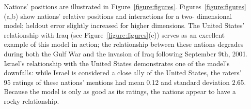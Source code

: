 Nations' positions are illustrated in Figure~\ref{figure:figures}.
Figures~\ref{figure:figures}(a,b) show nations' relative positions
and interactions for a two- dimensional model; heldout error slightly
increased for higher dimensions. The United States' relationship with
Iraq (see Figure~\ref{figure:figures}(c)) serves as an excellent
example of this model in action; the relationship between these
nations degrades during both the Gulf War and the invasion of Iraq
following September 9th, 2001.  Israel's relationship with the United
States demonstrates one of the model's downfalls: while Israel is
considered a close ally of the United States, the raters' 95 ratings
of these nations' mentions had mean 0.12 and standard deviation
2.65.  Because the model is only as good as its ratings, the nations
appear to have a rocky relationship.






